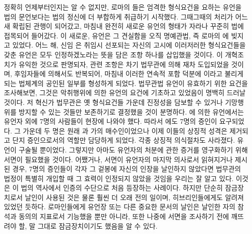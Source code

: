 정확히 언제부터인지는 알 수 없지만,
로마의 들은
엄격한 형식요건을 요하는 유언을
법의 문언보다는 법의 정신에 더 부합하게
취급하기 시작했다.
그때그때의 처리가 어느새 확립된 관행이 되어갔고,
마침내 완전히 새로운 유언의 형태가 자라나
꾸준히 법에 접목되어 들어갔다.
%
이 새로운,  유언은 그 견실함을
오직 명예관법, 즉 로마의 에
빚지고 있었다.
어느 해, 신임 은 취임시 선포되는 자신의 고시에
이러저러한 형식요건들을 갖춘 유언은 모두 인정하겠노라는 뜻을 담은
조항 하나를 삽입했을 것이다.
이 개혁조치가 유익한 것으로 판명되자, 관련 조항은
차기 법무관에 의해 재차 도입되었을 것이며,
후임자들에 의해서도 반복되어, 마침내
이러한 연속적 포함 덕분에 이라고 불리게 되는
법체계의 공인된 일부를 형성하게 되었다.
법무관법 유언이 유효하기 위한 요건을 조사해보면,
%
그것은 악취행위에 의한 유언의 요건에 기초하고 있었음이 명백히 드러날 것이다.
저 혁신가 법무관은 옛 형식요건들 가운데 진정성을 담보할 수 있거나
기망행위를 방지할 수 있는 것들만 보존하기로 결정했을 것이 분명하다.
에 의한 유언에서는 유언자 외에 7명의 사람들이 현장에 나와야 했다.
따라서 에도 7명의 증인이 요구되었다.
그 가운데 두 명은 원래 과
가의 매수인이었으나 이제 이들의 상징적 성격은
제거되고 단지 증인으로서의 역할만 담당하게 되었다.
각종 상징적 의식절차도 사라졌다.
유언이 구술될 뿐이었다. 그렇지만 아마도
유언자의 처분에 관한 증거를 영구화하기 위해 서면이 필요했을 것이다.
어쨌거나, 서면이 유언자의 마지막 의사로서 읽혀지거나 제시된 경우,
7명의 증인들이 각자 그 겉봉에 자신의 인장을 날인하지 않았다면
법무관의 법정이
특별히 개입할 때
그 효력이 인정되지 않았을 것임을 우리는 잘 알고 있다.
이것은
이
법의 역사에서
인증의 수단으로
처음 등장하는 사례이다.
하지만
단순히 잠금장치로서 날인이 사용된 것은 물론 훨씬 더 오래 전의 일이며,
히브리인들에게도 알려져있었던 듯하다.
로마인들에게 유언장 또는 다른 중요한 문서의 날인은
날인한 자의 참석과 동의의 지표로서 기능했을 뿐만 아니라,
또한
나중에 서면을 조사하기 전에 깨뜨려야 할, 말 그대로 잠금장치이기도 했음을
알 수 있다.

